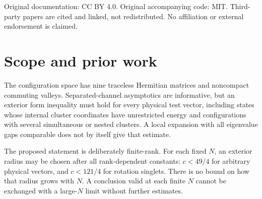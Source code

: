 \documentclass[11pt,letterpaper]{article}
\theoremstyle{definition}\newtheorem{hypothesis}[theorem]{Hypothesis}
\numberwithin{equation}{section}
\begin{document}
\begin{titlepage}
\vspace{0.2in}
\begin{abstract}
For the trace-normalized sixteen-supercharge $SU(N)$ matrix Hamiltonian, we assemble a candidate exterior quadratic-form proof at every fixed finite rank. The baseline bound has every coefficient $c<49/4$ on arbitrary physical exterior vectors. This revision adds $c<121/4$ on physical $\operatorname{Spin}(9)$ singlets, using a bounded-radius internal nonsinglet uncertainty estimate and rotation-equivariant cluster localization. Internal continua are retained; no internal spectral gap or ground-state projection is required. Combined with the existing Hasler--Hoppe theorem that every physical $L^2$ zero mode is rotation invariant, the proposed full argument gives ordinary radial moments of every order $0\le m<9$ for each actual zero mode. These conclusions depend on the complete baseline local and global analytical inputs, whose candidate derivations remain subject to specialist review. Existence, uniqueness, the endpoint $m=9$, uniformity in $N$, and full soft or scattering theorems are not established. Polchinski already stated the below-nine expectation through a Born--Oppenheimer tail argument; the rotation identities and weighted method also have substantial prior art. No priority or independent human or formal proof verification is claimed.
\end{abstract}
\vfill
Original documentation: CC BY 4.0. Original accompanying code: MIT. Third-party papers are cited and linked, not redistributed. No affiliation or external endorsement is claimed.
\end{titlepage}
\begingroup
\small
\setlength{\parskip}{0pt}
\tableofcontents
\endgroup
\clearpage

\section{Scope and prior work}
The configuration space has nine traceless Hermitian matrices and noncompact commuting valleys. Separated-channel asymptotics are informative, but an exterior form inequality must hold for every physical test vector, including states whose internal cluster coordinates have unrestricted energy and configurations with several simultaneous or nested clusters. A local expansion with all eigenvalue gaps comparable does not by itself give that estimate.

The proposed statement is deliberately finite-rank. For each fixed $N$, an exterior radius may be chosen after all rank-dependent constants: $c<49/4$ for arbitrary physical vectors, and $c<121/4$ for rotation singlets. There is no bound on how that radius grows with $N$. A conclusion valid at each finite $N$ cannot be exchanged with a large-$N$ limit without further estimates.
\end{document}
